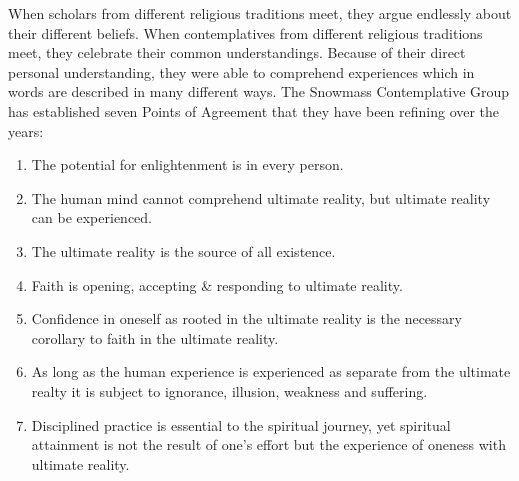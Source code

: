\documentclass[a5paper,10pt,english]{book}
\begin{document}
\sphinxAtStartPar
When scholars from different religious traditions meet, they argue
endlessly about their different beliefs. When contemplatives from
different religious traditions meet, they celebrate their common
understandings. Because of their direct personal understanding, they
were able to comprehend experiences which in words are described in many
different ways. The Snowmass Contemplative Group has established seven
Points of Agreement that they have been refining over the years:
\begin{enumerate}
%
\item {} 
\sphinxAtStartPar
The potential for enlightenment is in every person.

\item {} 
\sphinxAtStartPar
The human mind cannot comprehend ultimate reality, but ultimate
reality can be experienced.

\item {} 
\sphinxAtStartPar
The ultimate reality is the source of all existence.

\item {} 
\sphinxAtStartPar
Faith is opening, accepting \& responding to ultimate reality.

\item {} 
\sphinxAtStartPar
Confidence in oneself as rooted in the ultimate reality is the
necessary corollary to faith in the ultimate reality.

\item {} 
\sphinxAtStartPar
As long as the human experience is experienced as separate from the
ultimate realty it is subject to ignorance, illusion, weakness and
suffering.

\item {} 
\sphinxAtStartPar
Disciplined practice is essential to the spiritual journey, yet
spiritual attainment is not the result of one’s effort but the
experience of oneness with ultimate reality.

\end{enumerate}
\end{document}
